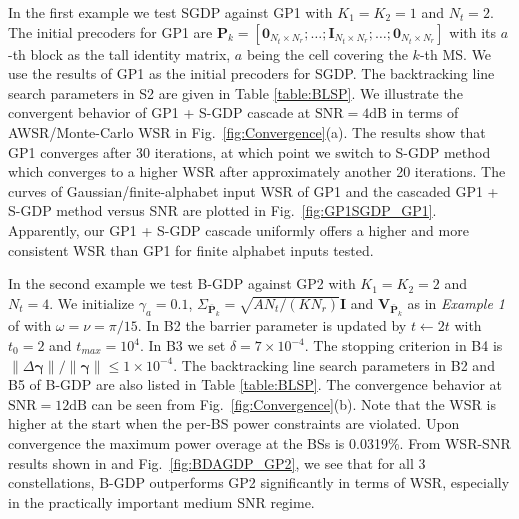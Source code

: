 \documentclass{article}
\begin{document}
In the first example we test SGDP against GP1 with $K_1 = K_2 = 1$ and $N_t= 2$. The initial precoders for GP1
are $\mathbf{P}_k = [\mathbf{0}_{N_t\times N_r};\ldots;\mathbf{I}_{N_t\times N_r};\ldots;\mathbf{0}_{N_t\times N_r}]$ with its $a$-th block as the tall identity matrix, $a$ being the cell
covering the $k$-th MS.
We use the results of GP1 as the initial precoders for SGDP.
The backtracking line search parameters \cite{boyd2004convex} in S2 are given in Table \ref{table:BLSP}.
We illustrate the convergent behavior of GP1 + S-GDP cascade at $\mbox{SNR} = 4\mbox{dB}$ in terms of AWSR/Monte-Carlo WSR in Fig.~\ref{fig:Convergence}(a).
The results show that GP1 converges after $30$ iterations,
at which point we switch to S-GDP method which converges to a higher WSR after approximately another 20 iterations.
The curves of Gaussian/finite-alphabet input WSR of GP1 and the cascaded GP1 + S-GDP method versus SNR are plotted in Fig.~\ref{fig:GP1SGDP_GP1}.
Apparently, our GP1 + S-GDP cascade uniformly offers a higher and more consistent WSR than GP1 for finite alphabet inputs tested.

In the second example we test B-GDP against GP2 with $K_1 = K_2 = 2$ and $N_t= 4$. We
 initialize $\gamma_a=0.1$, $\Sigma_{\bar{\mathbf{P}}_k} = \sqrt{AN_t/(KN_r)}\mathbf{I}$ and $\mathbf{V}_{\bar{\mathbf{P}}_k}$ as
in \emph{Example 1} of \cite{xiao2011globally} with $\omega=\nu=\pi/15$. In B2 the barrier parameter is updated by $t\leftarrow 2t$ with $t_0=2$ and $t_{max} = 10^4$. In B3 we set $\delta = 7\times10^{-4}$.
The stopping criterion in B4 is $\|\Delta\bm{\gamma}\|/\|\bm{\gamma}\|\leq1\times10^{-4}$. The backtracking line search parameters in B2 and B5 of B-GDP are also listed in Table \ref{table:BLSP}.
The convergence behavior at $\mbox{SNR} = 12\mbox{dB}$ can be seen from Fig.~\ref{fig:Convergence}(b).
Note that the WSR is higher at the start when the per-BS power constraints are violated. Upon convergence the maximum power overage
at the BSs is 0.0319\%. From WSR-SNR results shown in  and Fig.~\ref{fig:BDAGDP_GP2}, we see that
for all 3 constellations, B-GDP outperforms GP2 significantly in terms of WSR, especially in the practically important medium SNR regime.
\end{document}
